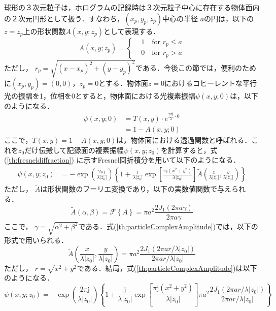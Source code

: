 球形の３次元粒子は，ホログラムの記録時は３次元粒子中心に存在する物体面内の２次元円形として扱う．すなわち，$(x_p,y_p,z_p)$中心の半径 $a$の円は，以下の $z=z_p$上の形状関数$A(x,y;z_p)$として表現する．
\begin{equation}
    \label{th:particleShapeFunction}
    A(x,y;z_p) = \left\{
    \begin{aligned}
        &1 \quad \text{for } r_p \leq a \\
        &0 \quad \text{for } r_p > a
    \end{aligned}
    \right.
\end{equation}
ただし， $r_p=\sqrt{(x-x_p)^2+(y-y_p)^2}$である．今後この節では，便利のために$(x_p,y_p) = (0,0)$，$z_p = 0$とする．物体面$z=0$におけるコヒーレントな平行光の振幅を1，位相を0とすると，物体面における光複素振幅$\psi(x,y;0)$は，以下のようになる．
\begin{align}
    \psi(x,y;0) &= T(x,y)\cdot e^{\frac{2\pi \mathrm{j}}{\lambda}\cdot 0} \\
    &= 1 - A(x,y;0)
\end{align}
ここで，$T(x,y) = 1 - A(x,y;0)$は，物体面における透過関数と呼ばれる．これを$z_0$だけ伝搬して記録面の複素振幅$\psi(x,y;z_0)$を計算すると，式(\ref{th:fresneldiffraction}) に示すFresnel回折積分を用いて以下のようになる\cite{vikram}．
\begin{align}
    \label{th:particleComplexAmplitude}
    \psi(x,y;z_0) &= -\exp{\left( \frac{2\pi \mathrm{j}}{\lambda |z_0|} \right)} \left\{  
        1 + \frac{\mathrm{j}}{\lambda |z_0|} \exp{\left[ \frac{\pi \mathrm{j} \left( x^2+y^2 \right)}{\lambda |z_0|}\right] \tilde{A}\left( \frac{x}{\lambda |z_0|}, \frac{y}{\lambda |z_0|} \right) }
     \right\}
\end{align}
ただし， $\tilde{A}$は形状関数のフーリエ変換であり，以下の実数値関数で与えられる．
\begin{equation}
    \tilde{A}(\alpha,\beta) = \mathcal{F}\left\{ A \right\} = \pi a^2 \frac{2J_1(2\pi a \gamma)}{2\pi a \gamma}
\end{equation}
ここで， $\gamma = \sqrt{\alpha^2+\beta^2}$である．式(\ref{th:particleComplexAmplitude})では，以下の形式で用いられる．
\begin{equation}
    \label{th:fourierOfA}
    \tilde{A}\left( \frac{x}{\lambda |z_0|}, \frac{y}{\lambda |z_0|} \right)  =  \pi a^2 \frac{2J_1(2\pi a r/ \lambda |z_0|)}{2\pi a r/ \lambda |z_0|}
\end{equation}
ただし， $r=\sqrt{x^2+y^2}$である．結局，式(\ref{th:particleComplexAmplitude})は以下のようになる．
\begin{equation}
    \label{th:particleComplexAmplitude2}
    \psi(x,y;z_0) = -\exp{\left( \frac{2\pi \mathrm{j}}{\lambda |z_0|} \right)} \left\{  
        1 + \frac{\mathrm{j}}{\lambda |z_0|} \exp{\left[ \frac{\pi \mathrm{j} \left( x^2+y^2 \right)}{\lambda |z_0|}\right] \pi a^2 \frac{2J_1(2\pi a r/ \lambda |z_0|)}{2\pi a r/ \lambda |z_0|} }
     \right\}
\end{equation}

